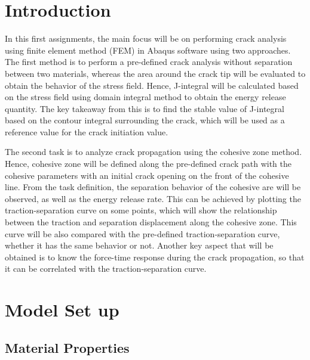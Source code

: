 \documentclass[12pt]{article}
\begin{document}
\section{Introduction} 
\hspace{2em}In this first assignments, the main focus will be on performing crack analysis
using finite element method (FEM) in Abaqus software using two approaches. The first
method is to perform a pre-defined crack analysis without separation between two materials,
whereas the area around the crack tip will be evaluated to obtain the behavior of the stress field. Hence, J-integral
will be calculated based on the stress field using domain integral method to obtain the energy release quantity. The key takeaway from this
is to find the stable value of J-integral based on the contour integral surrounding the crack, which will be used
as a reference value for the crack initiation value.

\hspace{2em}The second task is to analyze crack propagation using the cohesive zone method. Hence, cohesive zone
will be defined along the pre-defined crack path with the 
cohesive parameters with an initial crack opening on the front of the cohesive line. 
From the task definition, the separation behavior of the cohesive are will be observed, as well as the energy release 
rate. This can be achieved by plotting the traction-separation curve on some points, which will show the
relationship between the traction and separation displacement along the cohesive zone. This curve will be also compared with the
pre-defined traction-separation curve, whether it has the same behavior or not. Another key aspect that will be obtained
is to know the force-time response during the crack propagation, so that it can be correlated with the traction-separation
curve.


\section{Model Set up}

\subsection{Material Properties}
\end{document}
